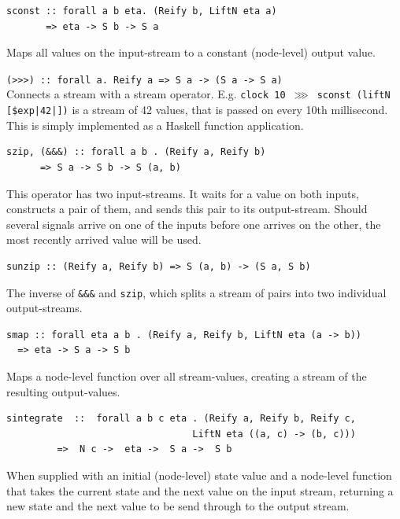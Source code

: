 \documentclass[a4paper, oneside, final]{memoir}
\begin{document}
\begin{description}
\item
\begin{verbatim}
sconst :: forall a b eta. (Reify b, LiftN eta a)
       => eta -> S b -> S a
\end{verbatim}
     Maps all values on the input-stream to a constant (node-level) output value.

\item \verb|(>>>) :: forall a. Reify a => S a -> (S a -> S a)|
  \hfill \\ Connects a stream with a stream operator.
  E.g. \texttt{clock 10 $\ggg$ sconst (liftN [\$exp|42|])} is a stream
  of 42 values, that is passed on every 10th millisecond. This is
  simply implemented as a Haskell function application.


\item 
\label{item:szip}
\begin{verbatim}
szip, (&&&) :: forall a b . (Reify a, Reify b)
      => S a -> S b -> S (a, b)
\end{verbatim}
  This operator has two input-streams. It waits for a value on both
  inputs, constructs a pair of them, and sends this pair to its
  output-stream.  Should several signals arrive on one of the inputs
  before one arrives on the other, the most recently arrived value
  will be used.

\item 
\begin{verbatim}
sunzip :: (Reify a, Reify b) => S (a, b) -> (S a, S b)
\end{verbatim}
  The inverse of \texttt{\&\&\&} and \texttt{szip}, which splits a
  stream of pairs into two individual output-streams.

\item 
\begin{verbatim}
smap :: forall eta a b . (Reify a, Reify b, LiftN eta (a -> b))
  => eta -> S a -> S b
\end{verbatim}
  Maps a node-level function over all stream-values, creating a stream
  of the resulting output-values.

\item
\begin{verbatim}
sintegrate  ::  forall a b c eta . (Reify a, Reify b, Reify c,
                                 LiftN eta ((a, c) -> (b, c)))
         =>  N c ->  eta ->  S a ->  S b
\end{verbatim}
  When supplied with an initial (node-level) state value and a
  node-level function that takes the current state and the next value
  on the input stream, returning a new state and the next value to be
  send through to the output stream.


\end{description}
\end{document}
